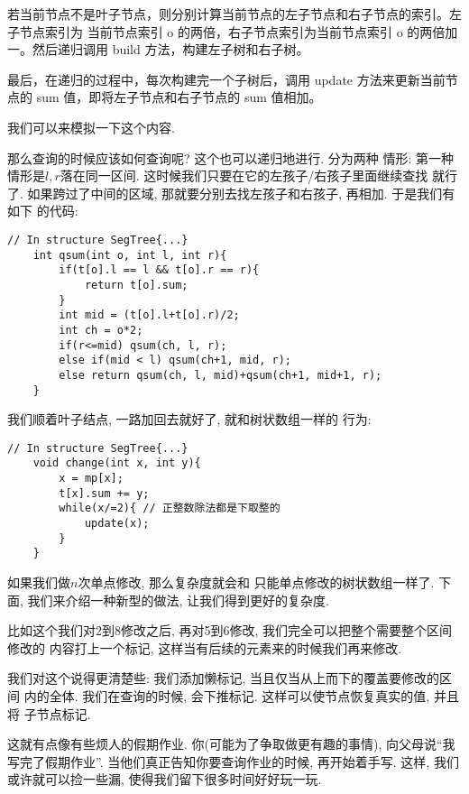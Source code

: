 若当前节点不是叶子节点，则分别计算当前节点的左子节点和右子节点的索引。左子节点索引为
当前节点索引 o 的两倍，右子节点索引为当前节点索引 o 的两倍加一。然后递归调用 
build 方法，构建左子树和右子树。

最后，在递归的过程中，每次构建完一个子树后，调用 update 方法来更新当前节点的 sum 值，即将左子节点和右子节点的 sum 值相加。

我们可以来模拟一下这个内容. 

那么查询的时候应该如何查询呢? 这个也可以递归地进行. 分为两种
情形: 第一种情形是$l,r$落在同一区间. 这时候我们只要在它的左孩子/右孩子里面继续查找
就行了. 如果跨过了中间的区域, 那就要分别去找左孩子和右孩子, 再相加. 于是我们有如下
的代码: 

\begin{lstlisting}
// In structure SegTree{...} 
    int qsum(int o, int l, int r){
        if(t[o].l == l && t[o].r == r){
            return t[o].sum;
        }
        int mid = (t[o].l+t[o].r)/2;
        int ch = o*2; 
        if(r<=mid) qsum(ch, l, r);
        else if(mid < l) qsum(ch+1, mid, r);
        else return qsum(ch, l, mid)+qsum(ch+1, mid+1, r); 
    }
\end{lstlisting}

 我们顺着叶子结点, 一路加回去就好了, 就和树状数组一样的
行为: 

\begin{lstlisting}
// In structure SegTree{...} 
    void change(int x, int y){
		x = mp[x];
		t[x].sum += y;
		while(x/=2){ // 正整数除法都是下取整的
			update(x);
		}
	}
\end{lstlisting}

 如果我们做$n$次单点修改, 那么复杂度就会和
只能单点修改的树状数组一样了. 下面, 我们来介绍一种新型的做法, 
让我们得到更好的复杂度. 


比如这个我们对2到8修改之后, 再对5到6修改, 我们完全可以把整个需要整个区间修改的
内容打上一个标记, 这样当有后续的元素来的时候我们再来修改. 

我们对这个说得更清楚些: 我们添加懒标记, 当且仅当从上而下的覆盖要修改的区间
内的全体. 我们在查询的时候, 会下推标记. 这样可以使节点恢复真实的值, 并且将
子节点标记. 

这就有点像有些烦人的假期作业. 你(可能为了争取做更有趣的事情), 
向父母说``我写完了假期作业''. 
当他们真正告知你要查询作业的时候, 再开始着手写. 这样, 我们或许就可以捡一些漏, 
使得我们留下很多时间好好玩一玩. 

